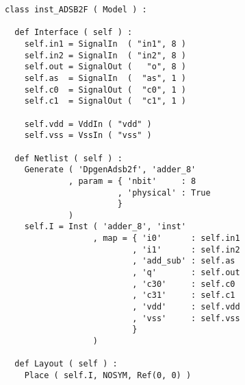 \begin{itemize}
\begin{verbatim}
class inst_ADSB2F ( Model ) :

  def Interface ( self ) :
    self.in1 = SignalIn  ( "in1", 8 )
    self.in2 = SignalIn  ( "in2", 8 )
    self.out = SignalOut (   "o", 8 )
    self.as  = SignalIn  (  "as", 1 )
    self.c0  = SignalOut (  "c0", 1 )
    self.c1  = SignalOut (  "c1", 1 )
    
    self.vdd = VddIn ( "vdd" )
    self.vss = VssIn ( "vss" )
    
  def Netlist ( self ) :
    Generate ( 'DpgenAdsb2f', 'adder_8'
             , param = { 'nbit'     : 8
                       , 'physical' : True
                       }
             )       
    self.I = Inst ( 'adder_8', 'inst'
                  , map = { 'i0'      : self.in1
                          , 'i1'      : self.in2
                          , 'add_sub' : self.as
                          , 'q'       : self.out
                          , 'c30'     : self.c0
                          , 'c31'     : self.c1
                          , 'vdd'     : self.vdd
                          , 'vss'     : self.vss
                          }
                  )
      
  def Layout ( self ) :
    Place ( self.I, NOSYM, Ref(0, 0) )
\end{verbatim}
\end{itemize}
